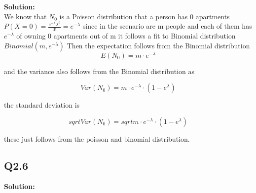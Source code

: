 \indent \textbf{Solution:} \\
We know that $N_0$ is a Poisson distribution that a person has 0 apartments $P(X=0) = \frac{e^{-\lambda} \lambda^0}{0!} = e^{-\lambda}$ 
since in the scenario are m people and each of them has $e^{-\lambda}$ of owning 0 apartments out of m
it follows a fit to Binomial distribution $Binomial(m,e^{-\lambda})$
Then the expectation follows from the Binomial distribution 
\[
    E(N_0)=m\cdot e^{-\lambda}  
\]

and the variance also follows from the Binomial distribution as

\[
    Var(N_0) = m \cdot e^{-\lambda} \cdot (1-e^{\lambda})    
\]

the standard deviation is 

\[
    sqrt{Var(N_0)} = sqrt{m \cdot e^{-\lambda} \cdot (1-e^{\lambda}) } 
\]

these just follows from the poisson and binomial distribution.




\subsection{Q2.6}

\indent \textbf{Solution:} \\





